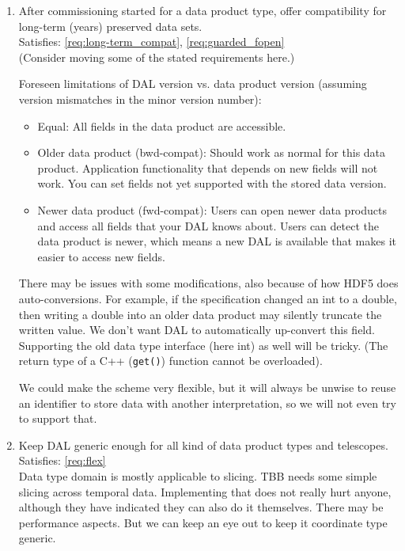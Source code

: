 \documentclass[a4paper,11pt]{article}
\begin{document}
\begin{enumerate}[label=\it D.\arabic{*}]
\item \label{dsg:long-term_compat} After commissioning started for a data product type, offer compatibility for long-term (years) preserved data sets.\\
Satisfies: \ref{req:long-term_compat}, \ref{req:guarded_fopen}\\
(Consider moving some of the stated requirements here.)

Foreseen limitations of DAL version vs. data product version (assuming version mismatches in the minor version number):
\begin{itemize}
\itemsep0em
\item Equal: All fields in the data product are accessible.
\item Older data product (bwd-compat):
Should work as normal for this data product.
Application functionality that depends on new fields will not work.
You can set fields not yet supported with the stored data version.
\item Newer data product (fwd-compat):
Users can open newer data products and access all fields that your DAL knows about.
Users can detect the data product is newer, which means a new DAL is available that makes it easier to access new fields.
\end{itemize}

There may be issues with some modifications, also because of how HDF5 does auto-conversions.
For example, if the specification changed an int to a double, then writing a double into an older data product may silently truncate the written value.
We don't want DAL to automatically up-convert this field.
Supporting the old data type interface (here int) as well will be tricky.
(The return type of a C++ (\texttt{get()}) function cannot be overloaded).

We could make the scheme very flexible, but it will always be unwise to reuse an identifier to store data with another interpretation, so we will not even try to support that.

\item \label{dsg:flex} Keep DAL generic enough for all kind of data product types and telescopes.
Satisfies: \ref{req:flex}\\
Data type domain is mostly applicable to slicing.
TBB needs some simple slicing across temporal data.
Implementing that does not really hurt anyone, although they have indicated they can also do it themselves.
There may be performance aspects.
But we can keep an eye out to keep it coordinate type generic.


\end{enumerate}
\end{document}
